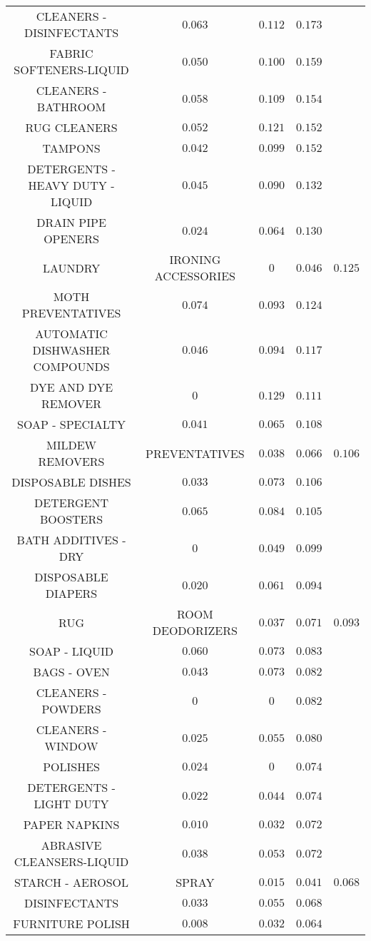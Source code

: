 \begin{table}[!htbp]
\begin{tabular}{@{\extracolsep{5pt}} cccc}
CLEANERS - DISINFECTANTS & $0.063$ & $0.112$ & $0.173$ \\
FABRIC SOFTENERS-LIQUID & $0.050$ & $0.100$ & $0.159$ \\
CLEANERS - BATHROOM & $0.058$ & $0.109$ & $0.154$ \\
RUG CLEANERS & $0.052$ & $0.121$ & $0.152$ \\
TAMPONS & $0.042$ & $0.099$ & $0.152$ \\
DETERGENTS - HEAVY DUTY - LIQUID & $0.045$ & $0.090$ & $0.132$ \\
DRAIN PIPE OPENERS & $0.024$ & $0.064$ & $0.130$ \\
LAUNDRY & IRONING ACCESSORIES & $0$ & $0.046$ & $0.125$ \\
MOTH PREVENTATIVES & $0.074$ & $0.093$ & $0.124$ \\
AUTOMATIC DISHWASHER COMPOUNDS & $0.046$ & $0.094$ & $0.117$ \\
DYE AND DYE REMOVER & $0$ & $0.129$ & $0.111$ \\
SOAP - SPECIALTY & $0.041$ & $0.065$ & $0.108$ \\
MILDEW REMOVERS & PREVENTATIVES & $0.038$ & $0.066$ & $0.106$ \\
DISPOSABLE DISHES & $0.033$ & $0.073$ & $0.106$ \\
DETERGENT BOOSTERS & $0.065$ & $0.084$ & $0.105$ \\
BATH ADDITIVES - DRY & $0$ & $0.049$ & $0.099$ \\
DISPOSABLE DIAPERS & $0.020$ & $0.061$ & $0.094$ \\
RUG & ROOM DEODORIZERS & $0.037$ & $0.071$ & $0.093$ \\
SOAP - LIQUID & $0.060$ & $0.073$ & $0.083$ \\
BAGS - OVEN & $0.043$ & $0.073$ & $0.082$ \\
CLEANERS - POWDERS & $0$ & $0$ & $0.082$ \\
CLEANERS - WINDOW & $0.025$ & $0.055$ & $0.080$ \\
POLISHES & $0.024$ & $0$ & $0.074$ \\
DETERGENTS - LIGHT DUTY & $0.022$ & $0.044$ & $0.074$ \\
PAPER NAPKINS & $0.010$ & $0.032$ & $0.072$ \\
ABRASIVE CLEANSERS-LIQUID & $0.038$ & $0.053$ & $0.072$ \\
STARCH - AEROSOL & SPRAY & $0.015$ & $0.041$ & $0.068$ \\
DISINFECTANTS & $0.033$ & $0.055$ & $0.068$ \\
FURNITURE POLISH & $0.008$ & $0.032$ & $0.064$ \\

\end{tabular}
\end{table}
